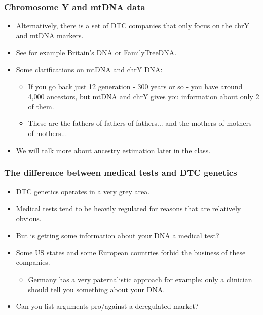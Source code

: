 \documentclass{beamer}
\begin{document}
\begin{frame}
  \frametitle{Chromosome Y and mtDNA data}
   \begin{itemize}
   \item Alternatively, there is a set of DTC companies that only focus on the chrY and mtDNA markers.
   \item See for example \href{http://www.britainsdna.com/}{Britain's DNA} or \href{http://www.familytreedna.com/}{FamilyTreeDNA}.
   \item Some clarifications on mtDNA and chrY DNA:
     \begin{itemize}
     \item If you go back just 12 generation - 300 years or so - you have around 4,000 ancestors, but mtDNA and chrY gives you information about only 2 of them.
     \item These are the fathers of fathers of fathers... and the mothers of mothers of mothers...
     \end{itemize}
   \item We will talk more about ancestry estimation later in the class.
   \end{itemize}
\end{frame}



\begin{frame}
  \frametitle{The difference between medical tests and DTC genetics}
  \begin{itemize}
  \item DTC genetics operates in a very grey area.
  \item Medical tests tend to be heavily regulated for reasons that are relatively obvious.
  \item But is getting some information about your DNA a medical test?
  \item Some US states and some European countries forbid the business of these companies.
    \begin{itemize}
    \item Germany has a very paternalistic approach for example: only a clinician should tell you something about your DNA.
    \end{itemize}
  \item Can you list arguments pro/against a deregulated market?
  \end{itemize}
\end{frame}
\end{document}
